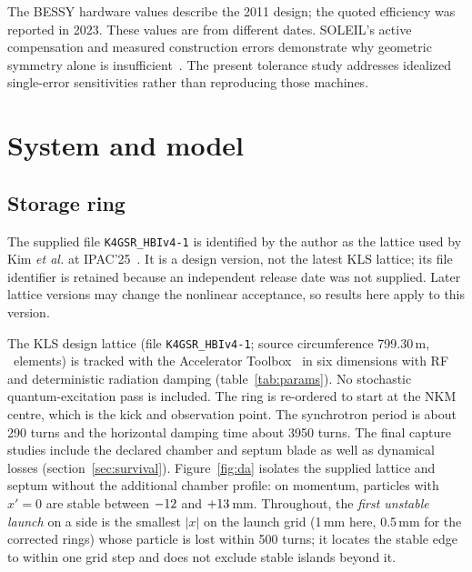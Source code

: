 \documentclass[aps,prab,reprint,amsmath,amssymb,floatfix,longbibliography]{revtex4-2}
\begin{document}
The BESSY hardware values describe the 2011 design; the quoted efficiency was reported in 2023. These values are from different dates. SOLEIL's active compensation and measured construction errors demonstrate why geometric symmetry alone is insufficient~\cite{Ollier2023}. The present tolerance study addresses idealized single-error sensitivities rather than reproducing those machines.

\section{System and model}
\label{sec:model}

\subsection{Storage ring}

The supplied file \texttt{K4GSR\_HBIv4-1} is identified by the author as the lattice used by Kim \emph{et al.} at IPAC'25~\cite{Kim2025}. It is a design version, not the latest KLS lattice; its file identifier is retained because an independent release date was not supplied. Later lattice versions may change the nonlinear acceptance, so results here apply to this version.

The KLS design lattice (file \texttt{K4GSR\_HBIv4-1}; source circumference 799.30\,m, \FinalSourceElements\ elements) is tracked with the Accelerator Toolbox~\cite{Terebilo2001,Rogers2017} in six dimensions with RF and deterministic radiation damping (table~\ref{tab:params}). No stochastic quantum-excitation pass is included. The ring is re-ordered to start at the NKM centre, which is the kick and observation point. The synchrotron period is about 290 turns and the horizontal damping time about 3950 turns. The final capture studies include the declared chamber and septum blade as well as dynamical losses (section~\ref{sec:survival}). Figure~\ref{fig:da} isolates the supplied lattice and septum without the additional chamber profile: on momentum, particles with $x'=0$ are stable between $-12$ and $+13$\,mm. Throughout, the \emph{first unstable launch} on a side is the smallest $|x|$ on the launch grid (1\,mm here, 0.5\,mm for the corrected rings) whose particle is lost within 500 turns; it locates the stable edge to within one grid step and does not exclude stable islands beyond it.
\end{document}
